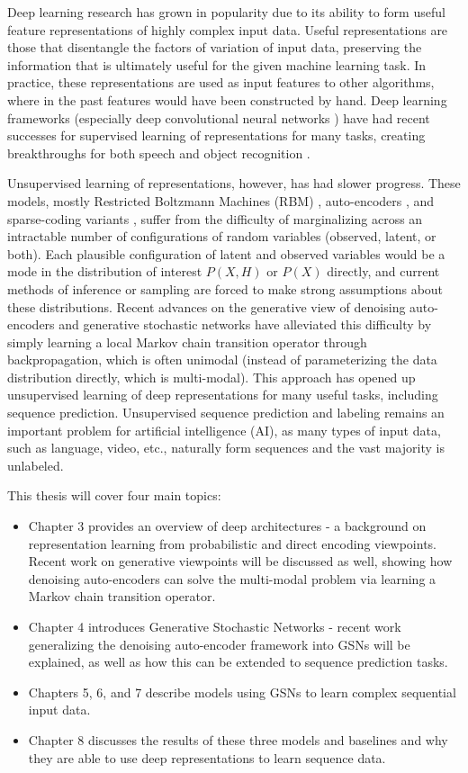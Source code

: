 Deep learning research has grown in popularity due to its ability to form useful feature representations of highly complex input data. Useful representations are those that disentangle the factors of variation of input data, preserving the information that is ultimately useful for the given machine learning task. In practice, these representations are used as input features to other algorithms, where in the past features would have been constructed by hand. Deep learning frameworks (especially deep convolutional neural networks \cite{lenet5}) have had recent successes for supervised learning of representations for many tasks, creating breakthroughs for both speech and object recognition \cite{seide11, krizhevsky12}.

Unsupervised learning of representations, however, has had slower progress. These models, mostly Restricted Boltzmann Machines (RBM) \cite{hinton06}, auto-encoders \cite{alain12}, and sparse-coding variants \cite{ranzato07}, suffer from the difficulty of marginalizing across an intractable number of configurations of random variables (observed, latent, or both). Each plausible configuration of latent and observed variables would be a mode in the distribution of interest \(P(X,H)\) or \(P(X)\) directly, and current methods of inference or sampling are forced to make strong assumptions about these distributions. Recent advances on the generative view of denoising auto-encoders and generative stochastic networks \cite{gsn} have alleviated this difficulty by simply learning a local Markov chain transition operator through backpropagation, which is often unimodal (instead of parameterizing the data distribution directly, which is multi-modal). This approach has opened up unsupervised learning of deep representations for many useful tasks, including sequence prediction. Unsupervised sequence prediction and labeling remains an important problem for artificial intelligence (AI), as many types of input data, such as language, video, etc., naturally form sequences and the vast majority is unlabeled.

This thesis will cover four main topics:
\begin{itemize}
	\item Chapter 3 provides an overview of deep architectures - a background on representation learning from probabilistic and direct encoding viewpoints. Recent work on generative viewpoints will be discussed as well, showing how denoising auto-encoders can solve the multi-modal problem via learning a Markov chain transition operator.
	\item Chapter 4 introduces Generative Stochastic Networks - recent work generalizing the denoising auto-encoder framework into GSNs will be explained, as well as how this can be extended to sequence prediction tasks.
	\item Chapters 5, 6, and 7 describe models using GSNs to learn complex sequential input data.
	\item Chapter 8 discusses the results of these three models and baselines and why they are able to use deep representations to learn sequence data.
\end{itemize}